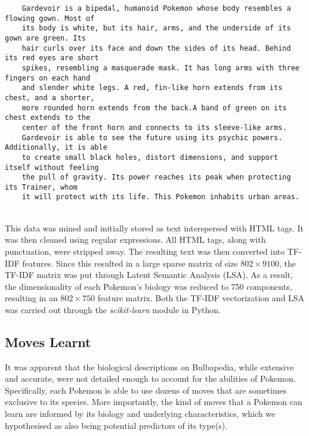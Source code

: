 \documentclass{winnower}
\begin{document}
\begin{verbatim}
    Gardevoir is a bipedal, humanoid Pokemon whose body resembles a flowing gown. Most of 
    its body is white, but its hair, arms, and the underside of its gown are green. Its 
    hair curls over its face and down the sides of its head. Behind its red eyes are short
    spikes, resembling a masquerade mask. It has long arms with three fingers on each hand 
    and slender white legs. A red, fin-like horn extends from its chest, and a shorter, 
    more rounded horn extends from the back.A band of green on its chest extends to the 
    center of the front horn and connects to its sleeve-like arms.
    Gardevoir is able to see the future using its psychic powers. Additionally, it is able 
    to create small black holes, distort dimensions, and support itself without feeling
    the pull of gravity. Its power reaches its peak when protecting its Trainer, whom 
    it will protect with its life. This Pokemon inhabits urban areas.
\end{verbatim}
\\
This data was mined and initially stored as text interspersed with HTML tags. It was then cleaned using regular expressions. All HTML tags, along with punctuation, were stripped away. The resulting text was then converted into TF-IDF features. Since this resulted in a large sparse matrix of size $802 \times 9100$, the TF-IDF matrix was put through Latent Semantic Analysis (LSA). As a result, the dimensionality of each Pokemon's biology was reduced to 750 components, resulting in an $802 \times 750$ feature matrix. Both the TF-IDF vectorization and LSA was carried out through the \emph{scikit-learn} module in Python.
\subsection{Moves Learnt}

It was apparent that the biological descriptions on Bulbapedia, while extensive and accurate, were not detailed enough to account for the abilities of Pokemon. Specifically, each Pokemon is able to use dozens of moves that are sometimes exclusive to its species. More importantly, the kind of moves that a Pokemon can learn are informed by its biology and underlying characteristics, which we hypothesised as also being potential predictors of its type(s). \\
\end{document}
